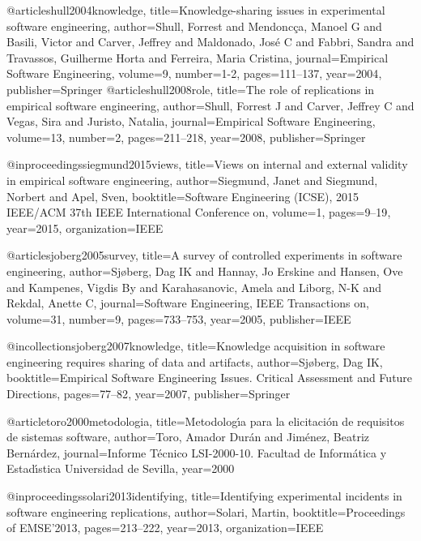 @article{shull2004knowledge,
  title={Knowledge-sharing issues in experimental software engineering},
  author={Shull, Forrest and Mendonc{\c{c}}a, Manoel G and Basili, Victor and Carver, Jeffrey and Maldonado, Jos{\'e} C and Fabbri, Sandra and Travassos, Guilherme Horta and Ferreira, Maria Cristina},
  journal={Empirical Software Engineering},
  volume={9},
  number={1-2},
  pages={111--137},
  year={2004},
  publisher={Springer}
} 
@article{shull2008role,
  title={The role of replications in empirical software engineering},
  author={Shull, Forrest J and Carver, Jeffrey C and Vegas, Sira and Juristo, Natalia},
  journal={Empirical Software Engineering},
  volume={13},
  number={2},
  pages={211--218},
  year={2008},
  publisher={Springer}
}


@inproceedings{siegmund2015views,
  title={Views on internal and external validity in empirical software engineering},
  author={Siegmund, Janet and Siegmund, Norbert and Apel, Sven},
  booktitle={Software Engineering (ICSE), 2015 IEEE/ACM 37th IEEE International Conference on},
  volume={1},
  pages={9--19},
  year={2015},
  organization={IEEE}
}

@article{sjoberg2005survey,
  title={A survey of controlled experiments in software engineering},
  author={Sj{\o}berg, Dag IK and Hannay, Jo Erskine and Hansen, Ove and Kampenes, Vigdis By and Karahasanovic, Amela and Liborg, N-K and Rekdal, Anette C},
  journal={Software Engineering, IEEE Transactions on},
  volume={31},
  number={9},
  pages={733--753},
  year={2005},
  publisher={IEEE}
}
 
@incollection{sjoberg2007knowledge,
  title={Knowledge acquisition in software engineering requires sharing of data and artifacts},
  author={Sj{\o}berg, Dag IK},
  booktitle={Empirical Software Engineering Issues. Critical Assessment and Future Directions},
  pages={77--82},
  year={2007},
  publisher={Springer}
}

@article{toro2000metodologia,
  title={Metodolog{\'\i}a para la elicitaci{\'o}n de requisitos de sistemas software},
  author={Toro, Amador Dur{\'a}n and Jim{\'e}nez, Beatriz Bern{\'a}rdez},
  journal={Informe T{\'e}cnico LSI-2000-10. Facultad de Inform{\'a}tica y Estad{\'\i}stica Universidad de Sevilla},
  year={2000}
}


@inproceedings{solari2013identifying,
  title={Identifying experimental incidents in software engineering replications},
  author={Solari, Martin},
  booktitle={Proceedings of EMSE'2013},
  pages={213--222},
  year={2013},
  organization={IEEE}
}

